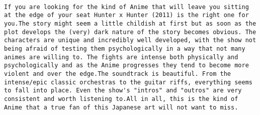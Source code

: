 \documentclass[
]{article}
\begin{document}
\begin{verbatim}
                                                                                                                                                                                                                                                                                                                                                                                                                                                                                                                                                                                                                                                                                                                                                                                                                               If you are looking for the kind of Anime that will leave you sitting at the edge of your seat Hunter x Hunter (2011) is the right one for you.The story might seem a little childish at first but as soon as the plot develops the (very) dark nature of the story becomes obvious. The characters are unique and incredibly well developed, with the show not being afraid of testing them psychologically in a way that not many animes are willing to. The fights are intense both physically and psychologically and as the Anime progresses they tend to become more violent and over the edge.The soundtrack is beautiful. From the intense/epic classic orchestras to the guitar riffs, everything seems to fall into place. Even the show's "intros" and "outros" are very consistent and worth listening to.All in all, this is the kind of Anime that a true fan of this Japanese art will not want to miss.

\end{verbatim}
\end{document}
